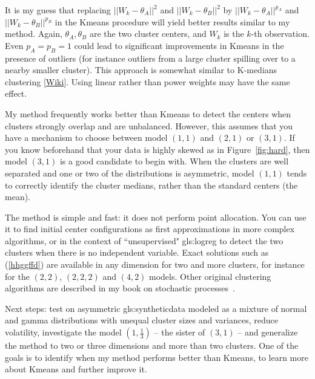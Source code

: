 \documentclass[oneside,10pt]{book}
\begin{document}
It is my guess that replacing $||W_k-\theta_A||^2$ and $||W_k-\theta_B||^2$
by $||W_k-\theta_A||^{p_A}$ and $||W_k-\theta_B||^{p_B}$
 in the Kmeans procedure will yield better results similar to my method. Again, $\theta_A, \theta_B$ are the two cluster centers, and $W_k$ is
 the $k$-th observation. Even $p_A=p_B=1$ could lead to significant improvements in Kmeans in the presence of outliers (for instance outliers from
 a large cluster spilling over to a nearby smaller cluster).
This approach is somewhat similar to \textcolor{index}{K-medians clustering} [\href{https://en.wikipedia.org/wiki/K-medians_clustering}{Wiki}]. Using linear rather than power weights may have the same effect. \vspace{1ex}


\noindent My method frequently works better than Kmeans to detect the centers when clusters strongly overlap and are unbalanced. However, this assumes that you have a
mechanism to choose between model $(1, 1)$ and $(2, 1)$ or $(3, 1)$.  If you know beforehand that your data is highly skewed as in
 Figure~\ref{fig:hard}, then model $(3, 1)$ is a good candidate to begin with. When the clusters are well separated and one or two of the distributions is asymmetric,
 model $(1, 1)$ tends to correctly identify the cluster medians, rather than the standard centers (the mean).

The method is simple and fast:  it does not perform point allocation. You can use it to find initial center configurations as first
 approximations in more complex algorithms, or in the context of ``unsupervised"
\gls{gls:logreg}
 to detect the two clusters when there is no independent variable.  Exact solutions such as (\ref{hhggffd}) are available in any dimension for two and more clusters, for instance for the $(2, 2)$, $(2,2,2)$ and $(4, 2)$ models. Other original clustering algorithms are described in my book on stochastic processes~\cite{vgsimulnew}.

Next steps: test on asymmetric \gls{gls:syntheticdata} modeled as a mixture of normal and gamma distributions with unequal cluster sizes and variances, reduce volatility, investigate the model $(1, \frac{1}{3})$ -- the sister of $(3, 1)$ -- and generalize the method to two or three dimensions and more than two clusters. One of the goals is to identify when my method performs better than Kmeans, to learn more about Kmeans and further improve it.
\end{document}

